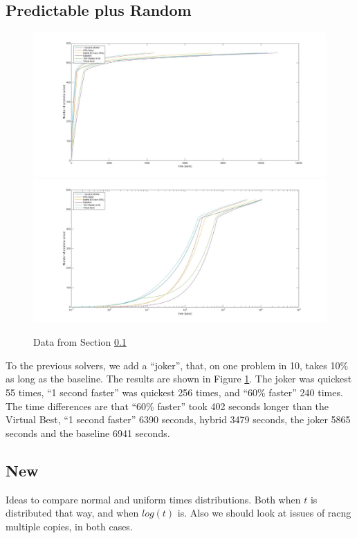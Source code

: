 \documentclass{article}
\begin{document}
\subsection{Predictable plus Random}\label{sec:P+J}
\begin{figure}[h]
\caption{Data from Section \ref{sec:P+J}\label{Fig:S4}}
\includegraphics[scale=0.25]{Fig4a.jpg}
\includegraphics[scale=0.25]{Fig4b.jpg}
\end{figure}
To the previous solvers, we add a ``joker'', that, on one problem in 10, takes 10\% as long as the baseline.  The results are shown in Figure \ref{Fig:S4}. The joker was quickest 55 times, ``1 second faster'' was quickest 256 times, and ``60\% faster'' 240 times. The time differences are that ``60\% faster'' took 402 seconds longer than the Virtual Best, ``1 second faster''  6390 seconds, hybrid 3479 seconds, the joker 5865 seconds and the baseline 6941 seconds.
\subsection{New}
Ideas to compare normal and uniform times distributions. Both when $t$ is distributed that way, and when $log(t)$ is. Also we should look at issues of racng multiple copies, in both cases.
\end{document}
